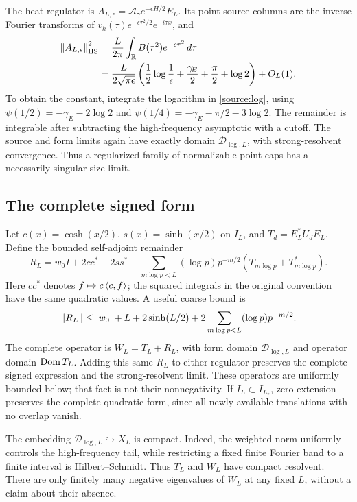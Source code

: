 The heat regulator is
$A_{L,\epsilon}=\mathcal A_\gamma e^{-\epsilon H/2}E_L$.
Its point-source columns are the inverse Fourier transforms of
$v_k(\tau)e^{-\epsilon\tau^2/2}e^{-i\tau x}$, and
\begin{align}
\left\lVert A_{L,\epsilon}\right\rVert_{\mathrm{HS}}^2
&=\frac L{2\pi}\int_\mathbb R B(\tau^2)e^{-\epsilon\tau^2}\,d\tau
\label{source:heat}\\
&=\frac{L}{2\sqrt{\pi\epsilon}}
\left(\frac12\log\frac1\epsilon+
\frac{\gamma_{\!E}}2+\frac\pi2+\log2\right)+O_L(1).
\nonumber
\end{align}
To obtain the constant, integrate the logarithm in
\eqref{source:log}, using
$\psi(1/2)=-\gamma_{\!E}-2\log2$ and
$\psi(1/4)=-\gamma_{\!E}-\pi/2-3\log2$.
The remainder is integrable after subtracting the high-frequency
asymptotic with a cutoff. The source and form limits again have
exactly domain $\mathcal D_{\log,L}$, with strong-resolvent
convergence. Thus a regularized family of normalizable point caps
has a necessarily singular size limit.

\subsection{The complete signed form}
Let $c(x)=\cosh(x/2)$, $s(x)=\sinh(x/2)$ on $I_L$, and
$T_d=E_L^*U_dE_L$. Define the bounded self-adjoint remainder
\begin{equation}\label{source:remainder}
R_L=w_0I+2cc^*-2ss^*
 -\sum_{m\log p<L}(\log p)p^{-m/2}(T_{m\log p}+T_{m\log p}^*).
\end{equation}
Here $cc^*$ denotes $f\mapsto c\left\langle c,f\right\rangle$; the squared integrals
in the original convention have the same quadratic values.
A useful coarse bound is
\[
\left\lVert R_L\right\rVert\le |w_0|+L+2\sinh(L/2)
                  +2\sum_{m\log p<L}(\log p)p^{-m/2}.
\]
The complete operator is
$W_L=T_L+R_L$, with form domain $\mathcal D_{\log,L}$ and
operator domain $\operatorname{Dom} T_L$. Adding this same $R_L$ to either
regulator preserves the complete signed expression and the
strong-resolvent limit. These operators are uniformly bounded
below; that fact is not their nonnegativity.
If $I_L\subset I_{L_*}$, zero extension preserves the complete
quadratic form, since all newly available translations with no
overlap vanish.

The embedding $\mathcal D_{\log,L}\hookrightarrow X_L$ is compact.
Indeed, the weighted norm uniformly controls the high-frequency
tail, while restricting a fixed finite Fourier band to a finite
interval is Hilbert--Schmidt. Thus $T_L$ and $W_L$ have compact
resolvent. There are only finitely many negative eigenvalues of
$W_L$ at any fixed $L$, without a claim about their absence.


